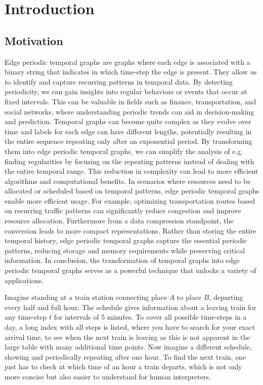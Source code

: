 \chapter{Introduction}
\label{ch:Introduction}
\section{Motivation}
\label{ch:Introduction:sec:Motivation}
Edge periodic temporal graphs are graphs where each edge is associated with a binary string that indicates in which time-step the edge is present.
They allow us to identify and capture recurring patterns in temporal data.
By detecting periodicity, we can gain insights into regular behaviors or events that occur at fixed intervals.
This can be valuable in fields such as finance, transportation, and social networks, where understanding periodic trends can aid in decision-making and prediction.
Temporal graphs can become quite complex as they evolve over time and labels for each edge can have different lengths, potentially resulting in the entire sequence repeating only after an exponential period.
By transforming them into edge periodic temporal graphs, we can simplify the analysis of e.g. finding regularities by focusing on the repeating patterns instead of dealing with the entire temporal range.
This reduction in complexity can lead to more efficient algorithms and computational benefits.
In scenarios where resources need to be allocated or scheduled based on temporal patterns, edge periodic temporal graphs enable more efficient usage.
For example, optimizing transportation routes based on recurring traffic patterns can significantly reduce congestion and improve resource allocation.
Furthermore from a data compression standpoint, the conversion leads to more compact representations.
Rather than storing the entire temporal history, edge periodic temporal graphs capture the essential periodic patterns, reducing storage and memory requirements while preserving critical information.
In conclusion, the transformation of temporal graphs into edge periodic temporal graphs serves as a powerful technique that unlocks a variety of applications.

Imagine standing at a train station connecting place $A$ to place $B$, departing every half and full hour.
The schedule gives information about a leaving train for any time-step $t$ for intervals of 5 minutes.
To cover all possible time-steps in a day, a long index with all steps is listed, where you have to search for your exact arrival time, to see when the next train is leaving as this is not apparent in the large table with many additional time points.
Now imagine a different schedule, showing and periodically repeating after one hour.
To find the next train, one just has to check at which time of an hour a train departs, which is not only more concise but also easier to understand for human interpreters.
